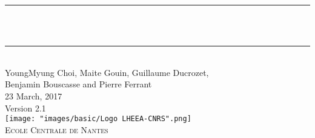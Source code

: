 
\fancyhf{}
\cfoot{\thepage}

\makeatletter
\let\thetitle\@title
\let\theauthor\@author
\let\thedate\@date
\makeatother


\begin{titlepage}
	\centering
    \vspace*{0.5 cm}    

	\rule{\linewidth}{0.2 mm} \\[0.8 cm]
	{ \huge \bfseries \thetitle}\\[0.3 cm]
	\rule{\linewidth}{0.2 mm} \\[0.8 cm]
	\textup{\large YoungMyung Choi, Maite Gouin, Guillaume Ducrozet, }\\[0.5 cm]		
	\textup{\large Benjamin Bouscasse and Pierre Ferrant}\\[1.0 cm]		
	
	\large{23 March, 2017} \\[0.5cm]	
	\large{Version 2.1} \\[4.0cm]

	\texttt{[image: "images/basic/Logo LHEEA-CNRS".png]}  \\[1.5 cm]
	
	 \textsc{\LARGE Ecole Centrale de Nantes}\\[1.0 cm]	%
	 
\end{titlepage}